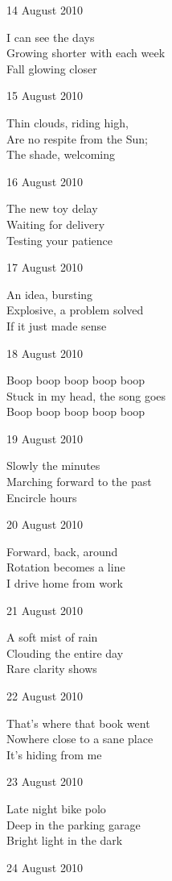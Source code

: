 \documentclass[12pt]{article}
\begin{document}
14 August 2010

I can see the days \\
Growing shorter with each week \\
Fall glowing closer

15 August 2010

Thin clouds, riding high, \\
Are no respite from the Sun; \\
The shade, welcoming

16 August 2010

The new toy delay \\
Waiting for delivery \\
Testing your patience

17 August 2010

An idea, bursting \\
Explosive, a problem solved \\
If it just made sense

\newpage

18 August 2010

Boop boop boop boop boop \\
Stuck in my head, the song goes \\
Boop boop boop boop boop

19 August 2010

Slowly the minutes \\
Marching forward to the past \\
Encircle hours

20 August 2010

Forward, back, around \\
Rotation becomes a line \\
I drive home from work

21 August 2010

A soft mist of rain \\
Clouding the entire day \\
Rare clarity shows

22 August 2010

That's where that book went \\
Nowhere close to a sane place \\
It's hiding from me

23 August 2010

Late night bike polo \\
Deep in the parking garage \\
Bright light in the dark

24 August 2010
\end{document}
